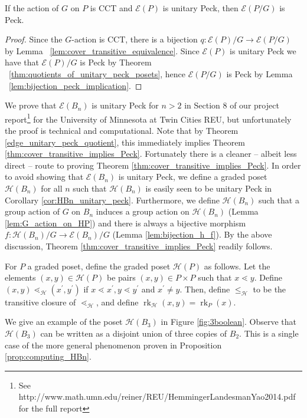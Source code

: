 \documentclass[smallextended]{svjour3}       %
\numberwithin{equation}{section}
\newcommand\rk{\operatorname{rk}}
\begin{document}
\begin{theorem}
\label{edge_unitary_peck_quotient}
If the action of $G$ on $P$ is CCT and $\mathcal E(P)$ is unitary Peck, then $\mathcal E(P/G)$ is Peck.
\end{theorem}
\begin{proof}
Since the $G$-action is CCT, there is a bijection $q\colon\mathcal{E}(P)/G \rightarrow \mathcal{E}(P/G)$ by Lemma ~\ref{lem:cover_transitive_equivalence}.  Since $\mathcal{E}(P)$ is unitary Peck we have that $\mathcal{E}(P)/G$ is Peck by Theorem ~\ref{thm:quotients_of_unitary_peck_posets}, hence $\mathcal{E}(P/G)$ is Peck by Lemma ~\ref{lem:bijection_peck_implication}.
\end{proof}

We prove that $\mathcal E(B_n)$ is unitary Peck for $n > 2$ in Section 8 of our project report\footnote{See http://www.math.umn.edu/reiner/REU/HemmingerLandesmanYao2014.pdf for the full report} for the University of Minnesota at Twin Cities REU, but unfortunately the proof is technical and computational. Note that by Theorem \ref{edge_unitary_peck_quotient}, this immediately implies Theorem \ref{thm:cover_transitive_implies_Peck}. Fortunately there is a cleaner -- albeit less direct -- route to proving Theorem \ref{thm:cover_transitive_implies_Peck}. In order to avoid showing that $\mathcal E(B_n)$ is unitary Peck, we define a graded poset $\mathcal{H}(B_n)$ for all $n$ such that $\mathcal{H}(B_n)$ is easily seen to be unitary Peck in Corollary \ref{cor:HBn_unitary_peck}. Furthermore, we define $\mathcal{H}(B_n)$ such that a group action of $G$ on $B_n$ induces a group action on $\mathcal{H}(B_n)$ (Lemma \ref{lem:G_action_on_HP}) and there is always a bijective morphism $f\colon \mathcal{H}(B_n)/G\rightarrow \mathcal E(B_n)/G$ (Lemma \ref{lem:bijection_h_f}).  By the above discussion, Theorem \ref{thm:cover_transitive_implies_Peck} readily follows.

\begin{definition}
\label{defn:h_map}
For $P$ a graded poset, define the graded poset $\mathcal H(P)$ as follows.  Let the elements $(x, y) \in \mathcal H(P)$ be pairs $(x,y) \in P\times P$ such that $x \lessdot y$.  Define $(x, y) \lessdot_{\mathcal H} (x^\prime, y^\prime)$ if $x \lessdot x^\prime,y\lessdot y^\prime$ and $x^\prime \neq y$.  Then, define $\leq_{\mathcal H}$ to be the transitive closure of $\lessdot_{\mathcal H}$, and define $\rk_{\mathcal H}(x, y) = \rk_P(x)$.
\end{definition}


\begin{example}
\label{eg:3boolean}
We give an example of the poset $\mathcal H(B_3)$ in Figure \ref{fig:3boolean}. Observe that $\mathcal H(B_3)$ can be written as a disjoint union of three copies of $B_2$. This is a single case of the more general phenomenon proven in Proposition \ref{prop:computing_HBn}.
\end{example}
\end{document}
